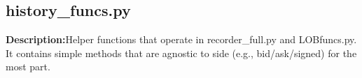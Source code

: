 \subsection{history\_funcs.py}\hfill \break
\noindent \textbf{Description:}Helper functions that operate in recorder\_full.py and LOBfuncs.py. It contains simple methods that are agnostic to side (e.g., bid/ask/signed) for the most part.  


\cleardoublepage


\cleardoublepage


\cleardoublepage


\cleardoublepage


\cleardoublepage


\cleardoublepage


\cleardoublepage
